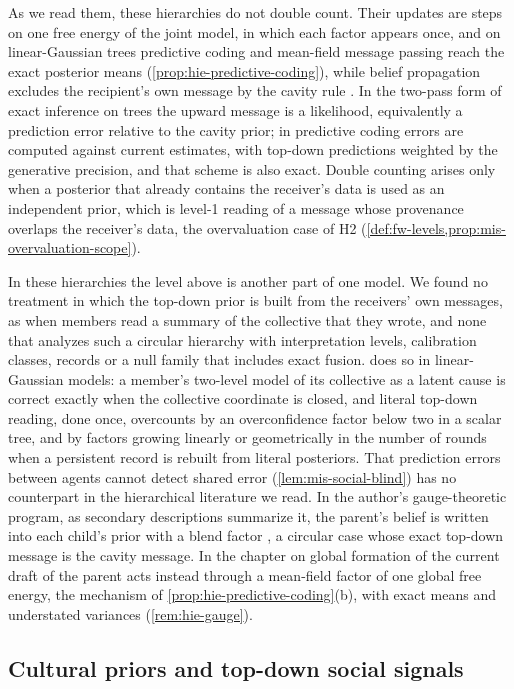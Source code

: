 As we read them, these hierarchies do not double count. Their updates are steps on one free energy of the joint model, in which each factor appears once, and on linear-Gaussian trees predictive coding and mean-field message passing reach the exact posterior means (\cref{prop:hie-predictive-coding}), while belief propagation excludes the recipient's own message by the cavity rule \citep{pearl1988probabilistic}. In the two-pass form of exact inference on trees the upward message is a likelihood, equivalently a prediction error relative to the cavity prior; in predictive coding errors are computed against current estimates, with top-down predictions weighted by the generative precision, and that scheme is also exact. Double counting arises only when a posterior that already contains the receiver's data is used as an independent prior, which is level-1 reading of a message whose provenance overlaps the receiver's data, the overvaluation case of H2 (\cref{def:fw-levels,prop:mis-overvaluation-scope}).

In these hierarchies the level above is another part of one model. We found no treatment in which the top-down prior is built from the receivers' own messages, as when members read a summary of the collective that they wrote, and none that analyzes such a circular hierarchy with interpretation levels, calibration classes, records or a null family that includes exact fusion.  does so in linear-Gaussian models: a member's two-level model of its collective as a latent cause is correct exactly when the collective coordinate is closed, and literal top-down reading, done once, overcounts by an overconfidence factor below two in a scalar tree, and by factors growing linearly or geometrically in the number of rounds when a persistent record is rebuilt from literal posteriors. That prediction errors between agents cannot detect shared error (\cref{lem:mis-social-blind}) has no counterpart in the hierarchical literature we read. In the author's gauge-theoretic program, as secondary descriptions summarize it, the parent's belief is written into each child's prior with a blend factor \citep{dennis2026formation}, a circular case whose exact top-down message is the cavity message. In the chapter on global formation of the current draft of \citet{dennis2026magent} the parent acts instead through a mean-field factor of one global free energy, the mechanism of \cref{prop:hie-predictive-coding}(b), with exact means and understated variances (\cref{rem:hie-gauge}).

\subsection{Cultural priors and top-down social signals}\label{sec:rel-culture}

